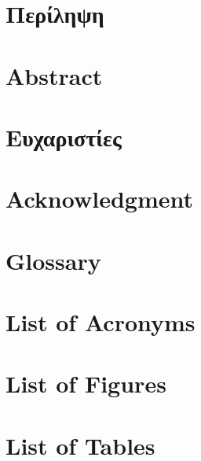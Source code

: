 \documentclass[12pt,twoside]{report}
\begin{document}
\pagestyle{empty}







\tableofcontents

\pagestyle{fancy}

\chapter*{Περίληψη}
\label{sec:greek_abstract}


\chapter*{Abstract}
\label{sec:abstract}


\chapter*{Ευχαριστίες}
\label{sec:greek_ack}


\chapter*{Acknowledgment}
\label{sec:ack}


\chapter*{Glossary}
\label{sec:glossary}


\chapter*{List of Acronyms}
\label{sec:acronyms}


\chapter*{List of Figures}
\label{sec:figures}


\chapter*{List of Tables}
\label{sec:tables}
\end{document}
